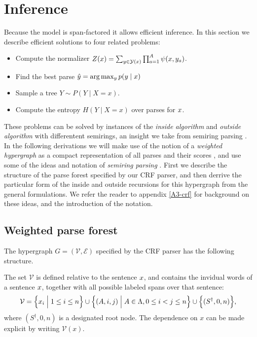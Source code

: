 \section{Inference}
  \label{sect:inference}
  Because the model is span-factored it allows efficient inference. In this section we describe efficient solutions to four related problems:
  \begin{itemize}
    \item Compute the normalizer $Z(x) = \sum_{ y \in \mathcal{Y}(x) } \prod_{ a=1 }^{ A } \psi( x, y_a )$.
    \item Find the best parse $\hat{ y } = \arg \max_{y } p(y  \mid x)$
    \item Sample a tree $Y \sim P(Y \mid X = x)$. %
    \item Compute the entropy $H(Y \mid X = x)$ over parses for $x$.
  \end{itemize}
  These problems can be solved by instances of the \textit{inside algorithm} and \textit{outside algorithm} \citep{baker1979trainable} with differentent semirings, an insight we take from semiring parsing \citep{goodman1999semiring}. In the following derivations we will make use of the notion of a \textit{weighted hypergraph} as a compact representation of all parses and their scores \citep{gallo1993directed,klein2004parsing}, and use some of the ideas and notation of \textit{semiring parsing} \citep{goodman1999semiring,eisner2009semirings}. First we describe the structure of the parse forest specified by our CRF parser, and then derrive the particular form of the inside and outside recursions for this hypergraph from the general formulations. We refer the reader to appendix \ref{A3-crf} for background on these ideas, and the introduction of the notation.

\subsection{Weighted parse forest}
  The hypergraph $G = (\mathcal{V}, \mathcal{E})$ specified by the CRF parser has the following structure.

  The set $\mathcal{V}$ is defined relative to the sentence $x$, and contains the invidual words of a sentence $x$, together with all possible labeled spans over that sentence:
  \begin{align*}
    \mathcal{V} = \Big\{ x_i \; \Big\vert \; 1 \leq i \leq n \Big\} \cup \Big\{ (A, i, j) \; \Big\vert \; A \in \Lambda, 0 \leq i < j \leq n \Big\} \cup \Big\{ (S^{\dagger}, 0, n) \Big\},
  \end{align*}
  where $(S^{\dagger}, 0, n)$ is a designated root node. The dependence on $x$ can be made explicit by writing $\mathcal{V}(x)$.

